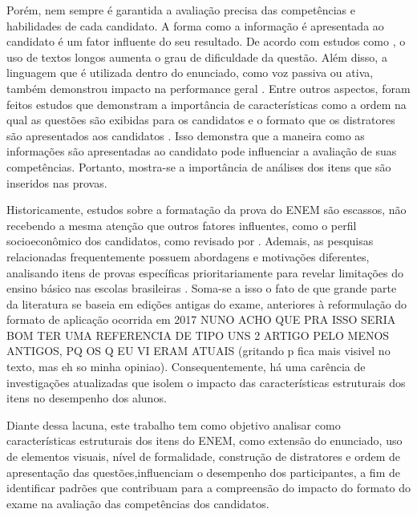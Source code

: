 \documentclass[a4paper,10pt, twocolumn]{article}
\begin{document}
Porém, nem sempre é garantida a avaliação precisa das competências e habilidades de cada candidato. A forma como a informação é apresentada ao candidato é um fator influente do seu resultado. De acordo com estudos como \textcite{Pullishery2020,2018,silva2019desempenho}, o uso de textos longos aumenta o grau de dificuldade da questão. Além disso, a linguagem que é utilizada dentro do enunciado, como voz passiva ou ativa, também demonstrou impacto na performance geral \cite{correia2004complexidade,Marcom2016}. Entre outros aspectos, foram feitos estudos que demonstram a importância de características como a ordem na qual as questões são exibidas para os candidatos \cite{Barichello2022,Anaya2023} e o formato que os distratores são apresentados aos candidatos \cite{Marcom2016,lopes2015estudo,Caldwell2013}. Isso demonstra que a maneira como as informações são apresentadas ao candidato pode influenciar a avaliação de suas competências. Portanto, mostra-se a importância de análises dos itens que são inseridos nas provas. 

Historicamente, estudos sobre a formatação da prova do ENEM são escassos, não recebendo a mesma atenção que outros fatores influentes, como o perfil socioeconômico dos candidatos, como revisado por \textcite{Dutra2023}. Ademais, as pesquisas relacionadas frequentemente possuem abordagens e motivações diferentes, analisando itens de provas específicas prioritariamente para revelar limitações do ensino básico nas escolas brasileiras \cite{Cestaro2020, lopes2015estudo}. Soma-se a isso o fato de que grande parte da literatura se baseia em edições antigas do exame, anteriores à reformulação do formato de aplicação ocorrida em 2017 NUNO ACHO QUE PRA ISSO SERIA BOM TER UMA REFERENCIA DE TIPO UNS 2 ARTIGO PELO MENOS ANTIGOS, PQ OS Q EU VI ERAM ATUAIS (gritando p fica mais visivel no texto, mas eh so minha opiniao). Consequentemente, há uma carência de investigações atualizadas que isolem o impacto das características estruturais dos itens no desempenho dos alunos.

Diante dessa lacuna, este trabalho tem como objetivo analisar como características estruturais dos itens do ENEM, como extensão do enunciado, uso de elementos visuais, nível de formalidade, construção de distratores e ordem de apresentação das questões,influenciam o desempenho dos participantes, a fim de identificar padrões que contribuam para a compreensão do impacto do formato do exame na avaliação das competências dos candidatos.
 
\end{document}
